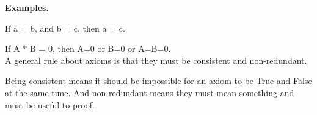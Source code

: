 \documentclass{article}
\begin{document}
\textbf{Examples.}

If a = b, and b = c, then a = c.

If A $*$ B = 0, then A=0 or B=0 or A=B=0.\\

A general rule about axioms is that they must
be consistent and non-redundant.

Being consistent means it should be impossible for an axiom
to be True and False at the same time.
And non-redundant means they must mean something and must be useful to proof.
\end{document}
